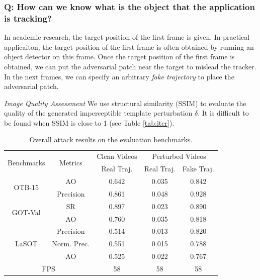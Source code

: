 \documentclass[journal]{IEEEtran}
\begin{document}
\subsubsection{Q: How can we know what is the object that the application is tracking?}

In academic research, the target position of the first frame is given. In practical applicaiton, the target position of the first frame is often obtained by running an object detector on this frame. Once the target position of the first frame is obtained, we can put the adversarial patch near the target to mislead the tracker. In the next frames, we can specify an arbitrary \textit{fake trajectory} to place the adversarial patch.

\textit{Image Quality Assessment} We use structural similarity (SSIM) \cite{SSIM} to evaluate the quality of the generated imperceptible template perturbation $\delta$. It is difficult to be found when SSIM is close to 1 (see Table \ref{tab:iter}).

\begin{table}
\centering
\caption{Overall attack results on the evaluation benchmarks.}
\begin{tabular}{c c | c | c | c}
\toprule
\multirow{2}{*}[-2pt]{Benchmarks} & \multirow{2}{*}[-2pt]{Metrics} & Clean Videos    & \multicolumn{2}{c}{Perturbed Videos}  \\
\cmidrule{3-5}
                          &                         & Real Traj. & Real Traj. & Fake Traj.     \\ 
\midrule
\multirow{2}{*}{OTB-15} 
& AO   & 0.642 & 0.035 & 0.842\\
& Precision & 0.861 & 0.048 & 0.928\\
\midrule
\multirow{2}{*}{GOT-Val} 
& SR & 0.897 & 0.023 & 0.890\\
& AO 				   & 0.760 & 0.035 & 0.818 \\
\midrule
\multirow{3}{*}{LaSOT} 
& Precision       & 0.514 & 0.013 & 0.820\\
& Norm. Prec. & 0.551 & 0.015 & 0.788\\
& AO & 0.525 & 0.022 & 0.767\\
\midrule
\multicolumn{2}{c|}{FPS} & 58 & 58 & 58\\
\bottomrule
\end{tabular}
\label{tab:benchmark results}
\end{table}
\end{document}
